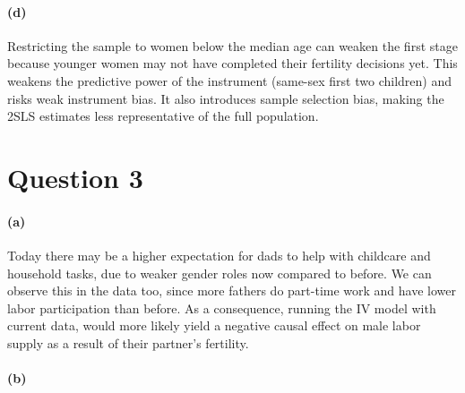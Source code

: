 \documentclass{scrartcl}
\begin{document}
\paragraph*{(d)}

Restricting the sample to women below the median age can weaken the first stage because younger women may not have completed their fertility decisions yet. This weakens the predictive power of the instrument (same-sex first two children) and risks weak instrument bias. It also introduces sample selection bias, making the 2SLS estimates less representative of the full population.

\section*{Question 3}

\paragraph*{(a)}

Today there may be a higher expectation for dads to help with childcare and household tasks, due to weaker gender roles now compared to before. We can observe this in the data too, since more fathers do part-time work and have lower labor participation than before. As a consequence, running the IV model with current data, would more likely yield a negative causal effect on male labor supply as a result of their partner's fertility.

\paragraph*{(b)}
\end{document}
